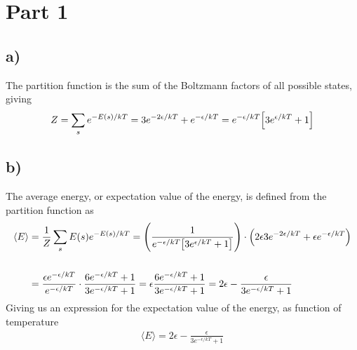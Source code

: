 \documentclass[12p,a4paper]{article}
\renewcommand{\exp}{e^}
\newcommand{\eE}{\langle E \rangle}
\begin{document}
\section*{Part 1}
\subsection*{a)}
The partition function is the sum of the Boltzmann factors of all possible states, giving
\begin{align*}
    Z = \sum\limits_s \exp{-E(s)/kT} = 3\exp{-2\epsilon/kT} + \exp{-\epsilon/kT} = \exp{-\epsilon/kT}\qty[3\exp{\epsilon/kT} + 1]
\end{align*}



\subsection*{b)}
The average energy, or expectation value of the energy, is defined from the partition function as
\begin{align*}
    \eE &= \frac{1}{Z} \sum\limits_s E(s)\exp{-E(s)/kT} = \qty(\frac{1}{\exp{-\epsilon/kT}\qty[3\exp{\epsilon/kT} + 1]})\cdot\qty(2\epsilon 3\exp{-2\epsilon/kT} + \epsilon\exp{-\epsilon/kT}) \\ \\
    &= \frac{\epsilon\exp{-\epsilon/kT}}{\exp{-\epsilon/kT}} \cdot \frac{6\exp{-\epsilon/kT} + 1}{3\exp{-\epsilon/kT} + 1}
    = \epsilon\frac{6\exp{-\epsilon/kT} + 1}{3\exp{-\epsilon/kT} + 1} = 2\epsilon - \frac{\epsilon}{3\exp{-\epsilon/kT} + 1}
\end{align*}
Giving us an expression for the expectation value of the energy, as function of temperature
\begin{align}\label{eqn:eE}
    \eE = 2\epsilon - \frac{\epsilon}{3\exp{-\epsilon/kT} + 1}
\end{align}
\end{document}

